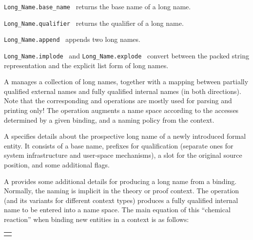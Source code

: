 \begin{isabellebody}
\begin{isamarkuptext}
  \begin{description}

  \item \verb|Long_Name.base_name|~ returns the base name
  of a long name.

  \item \verb|Long_Name.qualifier|~ returns the qualifier
  of a long name.

  \item \verb|Long_Name.append|~ appends two long
  names.

  \item \verb|Long_Name.implode|~ and \verb|Long_Name.explode|~ convert between the packed string
  representation and the explicit list form of long names.

  \end{description}%
\end{isamarkuptext}%
\isamarkuptrue%
%
\endisatagmlref
{\isafoldmlref}%
%
\isadelimmlref
%
\endisadelimmlref
%
\isamarkuptrue%
%
\begin{isamarkuptext}%
A  manages a collection of long names,
  together with a mapping between partially qualified external names
  and fully qualified internal names (in both directions).  Note that
  the corresponding  and  operations
  are mostly used for parsing and printing only!  The  operation augments a name space according to the accesses
  determined by a given binding, and a naming policy from the context.

  \medskip A  specifies details about the prospective
  long name of a newly introduced formal entity.  It consists of a
  base name, prefixes for qualification (separate ones for system
  infrastructure and user-space mechanisms), a slot for the original
  source position, and some additional flags.

  \medskip A  provides some additional details for
  producing a long name from a binding.  Normally, the naming is
  implicit in the theory or proof context.  The 
  operation (and its variants for different context types) produces a
  fully qualified internal name to be entered into a name space.  The
  main equation of this ``chemical reaction'' when binding new
  entities in a context is as follows:

  \medskip
  \begin{tabular}{l}
  \isa{binding\ {\isacharplus}\ naming\ {\isasymlongrightarrow}\ long\ name\ {\isacharplus}\ name\ space\ accesses}
  \end{tabular}


\end{isamarkuptext}
\end{isabellebody}
